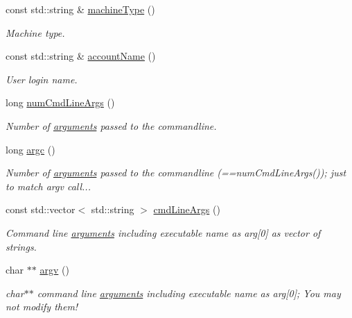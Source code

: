 \begin{DoxyCompactItemize}
const std::string \& \hyperlink{namespaceSystem_a21d0ee3eb17ae5ed59b3c6c01efce8d9}{machineType} ()
\begin{DoxyCompactList}\small\item\em Machine type. \item\end{DoxyCompactList}\item 
const std::string \& \hyperlink{namespaceSystem_a8a4ea73b74e0f6b8225e571e21ba4e2f}{accountName} ()
\begin{DoxyCompactList}\small\item\em User login name. \item\end{DoxyCompactList}\item 
long \hyperlink{namespaceSystem_a45f2f8ee27a6b62a7eb104306db16dc9}{numCmdLineArgs} ()
\begin{DoxyCompactList}\small\item\em Number of \hyperlink{namespacearguments}{arguments} passed to the commandline. \item\end{DoxyCompactList}\item 
long \hyperlink{namespaceSystem_aacf2e08c0661f343a44dc174a6931bc6}{argc} ()
\begin{DoxyCompactList}\small\item\em Number of \hyperlink{namespacearguments}{arguments} passed to the commandline (==numCmdLineArgs()); just to match argv call... \item\end{DoxyCompactList}\item 
const std::vector$<$ std::string $>$ \hyperlink{namespaceSystem_ac5277fb525c07b07bbd94a61e62bc0f5}{cmdLineArgs} ()
\begin{DoxyCompactList}\small\item\em Command line \hyperlink{namespacearguments}{arguments} including executable name as arg\mbox{[}0\mbox{]} as vector of strings. \item\end{DoxyCompactList}\item 
char $\ast$$\ast$ \hyperlink{namespaceSystem_ae3520381fd902d4fce860586feeb6c27}{argv} ()
\begin{DoxyCompactList}\small\item\em char$\ast$$\ast$ command line \hyperlink{namespacearguments}{arguments} including executable name as arg\mbox{[}0\mbox{]}; You may not modify them! \item\end{DoxyCompactList}\item 
$$
\end{DoxyCompactItemize}
